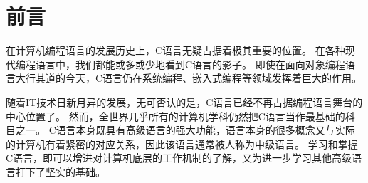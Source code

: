 \chapter{前言}
{
    在计算机编程语言的发展历史上，C语言无疑占据着极其重要的位置。
    在各种现代编程语言中，我们都能或多或少地看到C语言的影子。
    即使在面向对象编程语言大行其道的今天，C语言仍在系统编程、嵌入式编程等领域发挥着巨大的作用。

    随着IT技术日新月异的发展，无可否认的是，C语言已经不再占据编程语言舞台的中心位置了。
    然而，全世界几乎所有的计算机学科仍然把C语言当作最基础的科目之一。
    C语言本身既具有高级语言的强大功能，语言本身的很多概念又与实际的计算机有着紧密的对应关系，因此该语言通常被人称为中级语言。
    学习和掌握C语言，即可以增进对计算机底层的工作机制的了解，又为进一步学习其他高级语言打下了坚实的基础。
}

\cleardoublepage

\endinput
